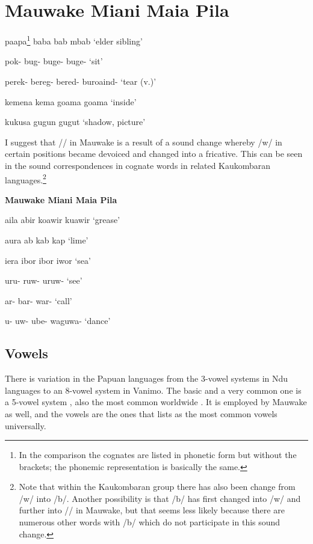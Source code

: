 \section{{\bfseries
Mauwake  Miani  Maia  Pila}}

paapa\footnote{In the comparison the cognates are listed in phonetic form but without the brackets; the phonemic representation is basically the same.}   baba  bab  mbab  `elder sibling'

pok-  bug-  buge-  buge-  `sit'

perek-  bereg-  bered-  buroaind-  `tear (v.)'

kemena  kema  goama  {\ng}goama  `inside'

kukusa  gugun    gugut  `shadow, picture'

I suggest that /{\textphi}/ in Mauwake is a result of a sound change whereby /w/ in certain positions became devoiced and changed into a fricative. This can be seen in the sound correspondences in cognate words in related Kaukombaran languages.\footnote{Note that within the Kaukombaran group there has also been change from /w/ into /b/.  Another possibility is that /b/ has first changed into /w/ and further into /{\textphi}/ in Mauwake, but that seems less likely because there are numerous other words with /b/ which do not participate in this sound change.} 

{\bfseries
Mauwake  Miani  Maia  Pila}

a{\textphi}ila  abir  koawir  kuawir  `grease'

a{\textphi}ura  ab  kab  kap  `lime'

i{\textphi}era  ibor  ibor  iwor  `sea'

uru{\textphi}-  ruw-  uruw-    `see'

{\textphi}ar-  bar-  war-    `call'

u{\textphi}-    uw-  ube-  waguwa-  `dance'

\subsection{Vowels}


There is variation in the Papuan languages from the 3-vowel systems in Ndu languages to an 8-vowel system in Vanimo. The basic and a very common one is a 5-vowel system \citep[49--54]{Foley1986}, also the most common worldwide \citep[126]{Maddieson1984}.  It is employed by Mauwake as well, and the vowels are the ones that \citet[125]{Maddieson1984} lists as the most common vowels universally. 
 
